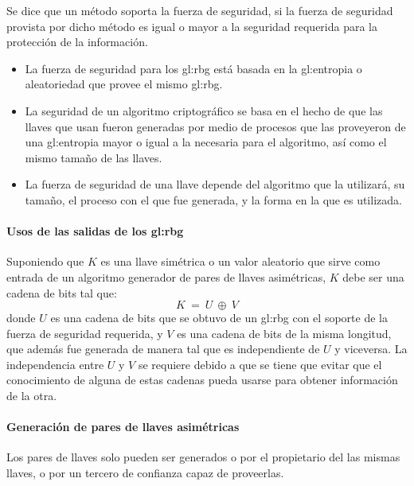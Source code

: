 Se dice que un método soporta la fuerza de seguridad, si la fuerza de
seguridad provista por dicho método es igual o mayor a la seguridad
requerida para la protección de la información.
\begin{itemize}

  \item La fuerza de seguridad para los \gls{gl:rbg} está basada en la
    \gls{gl:entropia} o aleatoriedad que provee el mismo \gls{gl:rbg}.

  \item La seguridad de un algoritmo criptográfico se basa en el hecho de
    que las llaves que usan fueron generadas por medio de procesos que las
    proveyeron de una \gls{gl:entropia} mayor o igual a la necesaria para el
    algoritmo, así como el mismo tamaño de las llaves.

  \item La fuerza de seguridad de una llave depende del algoritmo que la
    utilizará, su tamaño, el proceso con el que fue generada, y la forma en
    la que es utilizada.

\end{itemize}

\paragraph{Usos de las salidas de los \gls{gl:rbg}}
Suponiendo que $K$ es una llave simétrica o un valor aleatorio que sirve
como entrada de un algoritmo generador de pares de llaves asimétricas, $K$
debe ser una cadena de bits tal que:
\begin{equation}
  \label{bits_K}
  K\: =\: U\: \oplus\: V
\end{equation}
donde $U$ es una cadena de bits que se obtuvo de un \gls{gl:rbg} con el
soporte de la fuerza de seguridad requerida, y $V$ es una cadena de bits de la
misma longitud, que además fue generada de manera tal que es independiente de
$U$ y viceversa. La independencia entre $U$ y $V$ se requiere debido a que se
tiene que evitar que el conocimiento de alguna de estas cadenas pueda usarse
para obtener información de la otra.

\paragraph{Generación de pares de llaves asimétricas}
Los pares de llaves solo pueden ser generados o por el propietario del las
mismas llaves, o por un tercero de confianza capaz de proveerlas.

